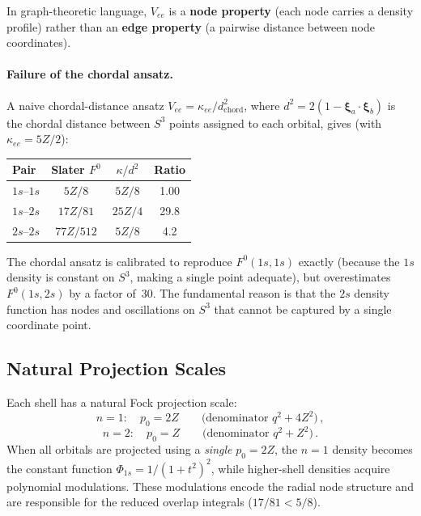 \documentclass[aps,pra,twocolumn,superscriptaddress,longbibliography]{revtex4-2}
\begin{document}
In graph-theoretic language, $V_{ee}$ is a \textbf{node property}
(each node carries a density profile) rather than an \textbf{edge
property} (a pairwise distance between node coordinates).

\paragraph{Failure of the chordal ansatz.}
A naive chordal-distance ansatz $V_{ee} = \kappa_{ee}/d^2_{\text{chord}}$,
where $d^2 = 2(1 - \boldsymbol{\xi}_a \cdot \boldsymbol{\xi}_b)$
is the chordal distance between $S^3$ points assigned to each orbital,
gives (with $\kappa_{ee} = 5Z/2$):
\begin{center}
\begin{tabular}{lccc}
\hline
Pair & Slater $F^0$ & $\kappa/d^2$ & Ratio \\
\hline
$1s$--$1s$ & $5Z/8$ & $5Z/8$ & 1.00 \\
$1s$--$2s$ & $17Z/81$ & $25Z/4$ & 29.8 \\
$2s$--$2s$ & $77Z/512$ & $5Z/8$ & 4.2 \\
\hline
\end{tabular}
\end{center}
The chordal ansatz is calibrated to reproduce $F^0(1s,1s)$ exactly
(because the $1s$ density is constant on $S^3$, making a single point
adequate), but overestimates $F^0(1s,2s)$ by a factor of~30.
The fundamental reason is that the $2s$ density function has nodes
and oscillations on $S^3$ that cannot be captured by a single coordinate
point.

\subsection{Natural Projection Scales}

Each shell has a natural Fock projection scale:
\begin{equation}
  n = 1: \quad p_0 = 2Z \qquad\text{(denominator } q^2 + 4Z^2\text{)} \,,
\end{equation}
\begin{equation}
  n = 2: \quad p_0 = Z \qquad\text{(denominator } q^2 + Z^2\text{)} \,.
\end{equation}
When all orbitals are projected using a \emph{single} $p_0 = 2Z$, the
$n=1$ density becomes the constant function $\Phi_{1s} = 1/(1+t^2)^2$,
while higher-shell densities acquire polynomial modulations. These
modulations encode the radial node structure and are responsible for
the reduced overlap integrals ($17/81 < 5/8$).
\end{document}
